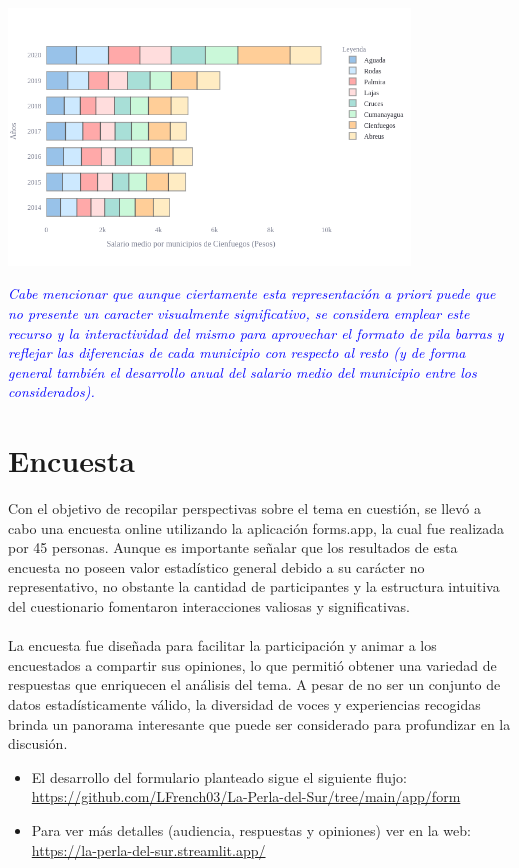 \documentclass{article}
\begin{document}
\begin{center}
    \includegraphics[width=0.8\textwidth]{img/fig7.png}
\end{center}
\emph{\textcolor{blue}{Cabe mencionar que aunque ciertamente esta representación a priori puede que no presente un caracter visualmente significativo, se considera emplear este recurso y la interactividad del mismo para aprovechar el formato de pila barras y reflejar las diferencias de cada municipio con respecto al resto (y de forma general también el desarrollo anual del salario medio del municipio entre los considerados).}}
\clearpage
\section{Encuesta}
Con el objetivo de recopilar perspectivas sobre el tema en cuestión, se llevó a cabo una encuesta online utilizando la aplicación forms.app, la cual fue realizada por 45 personas. Aunque es importante señalar que los resultados de esta encuesta no poseen valor estadístico general debido a su carácter no representativo, no obstante la cantidad de participantes y la estructura intuitiva del cuestionario fomentaron interacciones valiosas y significativas.\\\\
La encuesta fue diseñada para facilitar la participación y animar a los encuestados a compartir sus opiniones, lo que permitió obtener una variedad de respuestas que enriquecen el análisis del tema. A pesar de no ser un conjunto de datos estadísticamente válido, la diversidad de voces y experiencias recogidas brinda un panorama interesante que puede ser considerado para profundizar en la discusión.\\
\begin{itemize}
    \item El desarrollo del formulario planteado sigue el siguiente flujo: \url{https://github.com/LFrench03/La-Perla-del-Sur/tree/main/app/form}
    \item Para ver más detalles (audiencia, respuestas y opiniones) ver en la web: \url{https://la-perla-del-sur.streamlit.app/}
\end{itemize}
\end{document}
